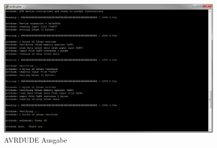 \begin{figure}
\centering
\includegraphics[width=13cm]{content/pictures/Anleitung/neuerProzessor/avrOutput.png}
\caption{AVRDUDE Ausgabe}
\end{figure}


